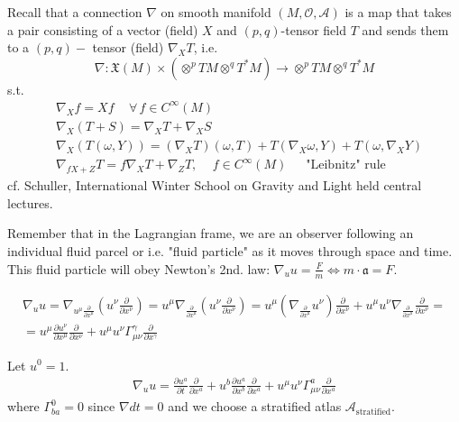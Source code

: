 Recall that a connection $\nabla$ on smooth manifold $(M, \mathcal{O}, \mathcal{A})$ is a map that takes a pair consisting of a vector (field) $X$ and $(p,q)$-tensor field $T$ and sends them to a $(p,q)-$ tensor (field) $\nabla_XT$, i.e. 
\[
\nabla : \mathfrak{X}(M) \times (\otimes^p TM \otimes^q T^*M) \to \otimes^p TM \otimes^q T^*M
\]
s.t. 
\[
\begin{aligned}
& \nabla_X f = Xf \quad \, \forall \, f \in C^{\infty}(M) \\ 
& \nabla_X(T + S) = \nabla_X T + \nabla_X S \\ 
& \nabla_X(T(\omega, Y)) = (\nabla_X T)(\omega, T) + T(\nabla_X \omega, Y) + T(\omega, \nabla_X Y) \\
& \nabla_{fX + Z} T = f\nabla_X T + \nabla_Z T , \quad \, f \in C^{\infty}(M) \quad \, \text{ "Leibnitz" rule }
\end{aligned}
\]
cf. Schuller, International Winter School on Gravity and Light held central lectures.

Remember that in the Lagrangian frame, we are an observer following an individual fluid parcel or i.e. "fluid particle" as it moves through space and time. This fluid particle will obey Newton's 2nd. law: $\nabla_{u} u = \frac{F}{m} \Longleftrightarrow m \cdot \mathfrak{a} = F$. 

\[
\begin{gathered}
\nabla_u u = \nabla_{u^{\mu}\frac{\partial}{\partial x^{\mu}}} (u^{\nu} \frac{\partial}{\partial x^{\nu}}) = u^{\mu} \nabla_{\frac{ \partial }{\partial x^{\mu}} } (u^{\nu} \frac{ \partial }{ \partial x^{\nu}}) =  u^{\mu} \left( \nabla_{\frac{ \partial }{\partial x^{\mu}} } u^{\nu} \right) \frac{ \partial }{ \partial x^{\nu}} + u^{\mu} u^{\nu} \nabla_{\frac{ \partial }{\partial x^{\mu}} }  \frac{ \partial }{ \partial x^{\nu}} = \\
	= u^{\mu} \frac{ \partial u^{\nu} }{ \partial x^{\mu}} \frac{\partial}{\partial x^{\nu}} + u^{\mu}u^{\nu} \Gamma^{\gamma}_{\mu \nu} \frac{\partial}{\partial x^{\gamma}}
	\end{gathered}
	\]

Let $u^0 = 1$.
\[
\begin{gathered}
\nabla_u u = \frac{\partial u^a}{\partial t} \frac{\partial }{ \partial x^a} + u^b \frac{\partial u^a}{\partial x^b} \frac{\partial}{\partial x^a} + u^{\mu} u^{\nu} \Gamma^a_{\mu \nu} \frac{\partial}{\partial x^a}
\end{gathered}
\]
where $\Gamma^0_{ba} = 0$ since $\nabla dt =0$ and we choose a stratified atlas $\mathcal{A}_{\text{stratified}}$.

